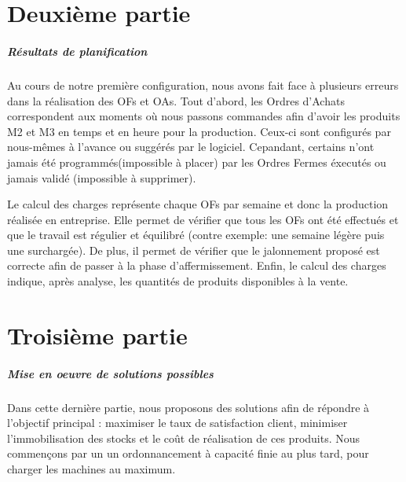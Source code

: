 \documentclass{scrreprt}
\begin{document}
\chapter{Deuxième partie} 

\paragraph{Résultats de planification}

Au cours de notre première configuration, nous avons fait face à plusieurs erreurs dans la réalisation des OFs et OAs. Tout d'abord, les Ordres d'Achats correspondent aux moments où nous passons commandes afin d'avoir les produits M2 et M3 en temps et en heure pour la production. Ceux-ci sont configurés par nous-mêmes à l'avance ou suggérés par le logiciel. Cepandant, certains n'ont jamais été programmés(impossible à placer) par les Ordres Fermes éxecutés  ou jamais validé (impossible à supprimer). 

Le calcul des charges représente chaque OFs par semaine et donc la production réalisée en entreprise.
Elle permet de vérifier que tous les OFs ont été effectués et que le travail est régulier et équilibré
(contre exemple: une semaine légère puis une surchargée). De plus, il permet de vérifier que le jalonnement proposé est correcte afin de passer à la phase d'affermissement. Enfin, le calcul des charges indique, après analyse, les quantités de produits disponibles à la vente.

\chapter{Troisième partie}

\paragraph{Mise en oeuvre de solutions possibles}

Dans cette dernière partie, nous proposons des solutions afin de répondre à l'objectif principal : maximiser le taux de satisfaction client, minimiser l'immobilisation des stocks et
le coût de réalisation de ces produits. Nous commençons par un un ordonnancement à capacité finie au plus tard, pour charger les machines au maximum.
\end{document}
